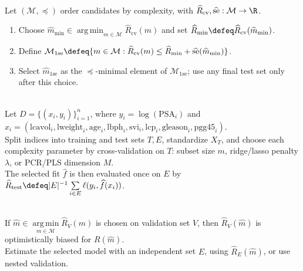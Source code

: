 \begin{method} \label{meth:sl-one-standard-error-rule} \\
Let $(\mathcal{M},\preceq)$ order candidates by complexity, with $\widehat{R}_{\mathrm{cv}},\widehat{\operatorname{se}}:\mathcal{M}\to\R$.
\begin{enumerate}[label=(\roman*)]
\setlength{\itemsep}{0pt}
\item Choose $\widehat{m}_{\min}\in\operatorname*{arg\,min}_{m\in\mathcal{M}}\widehat{R}_{\mathrm{cv}}(m)$ and set $\widehat{R}_{\min}\defeq\widehat{R}_{\mathrm{cv}}(\widehat{m}_{\min})$.
\item Define $\mathcal{M}_{1\mathrm{se}}\defeq\{m\in\mathcal{M}:\widehat{R}_{\mathrm{cv}}(m)\leq\widehat{R}_{\min}+\widehat{\operatorname{se}}(\widehat{m}_{\min})\}$.
\item Select $\widehat{m}_{1\mathrm{se}}$ as the $\preceq$-minimal element of $\mathcal{M}_{1\mathrm{se}}$; use any final test set only after this choice.
\end{enumerate}
\end{method}

\begin{example} \label{ex:sl-prostate-selection-shrinkage-workflow} \\
Let $D=\{(x_i,y_i)\}_{i=1}^n$, where $y_i=\log(\mathrm{PSA}_i)$ and $x_i=(\mathrm{lcavol}_i,\mathrm{lweight}_i,\mathrm{age}_i,\mathrm{lbph}_i,\mathrm{svi}_i,\mathrm{lcp}_i,\mathrm{gleason}_i,\mathrm{pgg45}_i)$.\\
Split indices into training and test sets $T,E$, standardize $X_T$, and choose each complexity parameter by cross-validation on $T$: subset size $m$, ridge/lasso penalty $\lambda$, or PCR/PLS dimension $M$.\\
The selected fit $\widehat{f}$ is then evaluated once on $E$ by $\widehat{R}_{\mathrm{test}}\defeq |E|^{-1}\sum\limits_{i\in E}\ell(y_i,\widehat{f}(x_i))$.
\end{example}

\begin{remark} \label{rem:sl-selection-bias} \\
If $\widehat{m}\in\operatorname*{arg\,min}\limits_{m\in\mathcal{M}}\widehat{R}_V(m)$ is chosen on validation set $V$, then $\widehat{R}_V(\widehat{m})$ is optimistically biased for $R(\widehat{m})$.\\
Estimate the selected model with an independent set $E$, using $\widehat{R}_E(\widehat{m})$, or use nested validation.
\end{remark}

